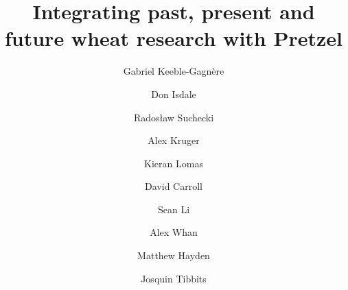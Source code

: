 \documentclass[10pt,a4paper]{article}
\title{Integrating past, present and future wheat research with Pretzel}
\author[1]{Gabriel Keeble-Gagn\`ere}
\author[1]{Don Isdale}
\author[2]{Rados{\l}aw Suchecki}
\author[2]{Alex Kruger}
\author[2]{Kieran Lomas}
\author[2]{David Carroll}
\author[2]{Sean Li}
\author[2]{Alex Whan}
\author[1]{Matthew Hayden}
\author[1]{Josquin Tibbits}
\affil[1]{Agriculture Victoria Research}
\affil[2]{Commonwealth Scientific and Industrial Research Organisation}
\begin{document}
\maketitle

\begin{abstract}
\noindent

\end{abstract}


\end{document}
